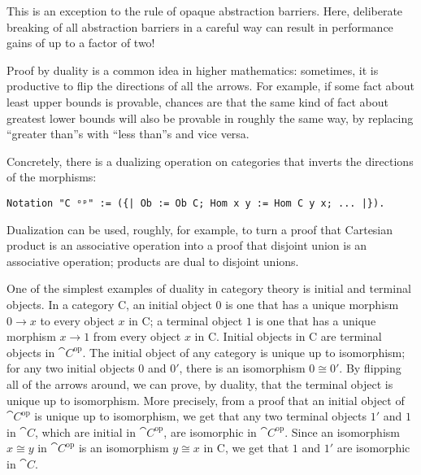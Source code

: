 This is an exception to the rule of opaque abstraction barriers.
Here, deliberate breaking of all abstraction barriers in a careful way can result in performance gains of up to a factor of two!

Proof by duality is a common idea in higher mathematics: sometimes, it is productive to flip the directions of all the arrows.
For example, if some fact about least upper bounds is provable, chances are that the same kind of fact about greatest lower bounds will also be provable in roughly the same way, by replacing ``greater than''s with ``less than''s and vice versa.

Concretely, there is a dualizing operation on categories that inverts the directions of the morphisms:
\begin{verbatim}
Notation "C ᵒᵖ" := ({| Ob := Ob C; Hom x y := Hom C y x; ... |}).
\end{verbatim}

Dualization can be used, roughly, for example, to turn a proof that Cartesian product is an associative operation into a proof that disjoint union is an associative operation; products are dual to disjoint unions.

One of the simplest examples of duality in category theory is initial and terminal objects.
In a category \cat C, an initial object $0$ is one that has a unique morphism $0 \to x$ to every object $x$ in \cat C; a terminal object $1$ is one that has a unique morphism $x \to 1$ from every object $x$ in \cat C.
Initial objects in \cat C are terminal objects in $\cat{C}^\text{op}$.
The initial object of any category is unique up to isomorphism; for any two initial objects $0$ and $0'$, there is an isomorphism $0 \cong 0'$.
By flipping all of the arrows around, we can prove, by duality, that the terminal object is unique up to isomorphism.  More precisely, from a proof that an initial object of $\cat{C}^{\text{op}}$ is unique up to isomorphism, we get that any two terminal objects $1'$ and $1$ in $\cat{C}$, which are initial in $\cat{C}^{\text{op}}$, are isomorphic in $\cat{C}^{\text{op}}$.  Since an isomorphism $x \cong y$ in $\cat{C}^\text{op}$ is an isomorphism $y \cong x$ in \cat C, we get that $1$ and $1'$ are isomorphic in $\cat C$.

